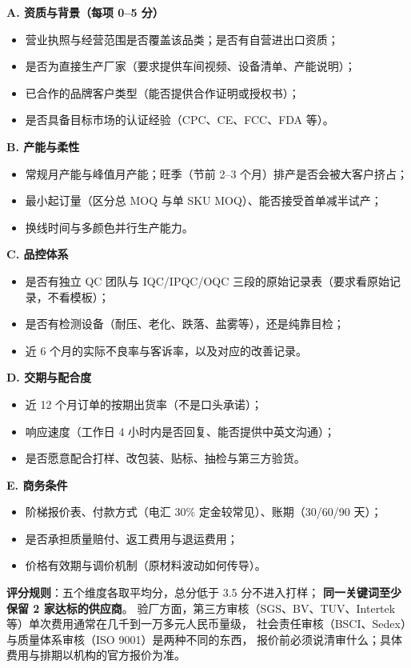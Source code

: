 \begin{toolbox}
\textbf{A. 资质与背景（每项 0--5 分）}
\begin{itemize}
  \item 营业执照与经营范围是否覆盖该品类；是否有自营进出口资质；
  \item 是否为直接生产厂家（要求提供车间视频、设备清单、产能说明）；
  \item 已合作的品牌客户类型（能否提供合作证明或授权书）；
  \item 是否具备目标市场的认证经验（CPC、CE、FCC、FDA 等）。
\end{itemize}
\textbf{B. 产能与柔性}
\begin{itemize}
  \item 常规月产能与峰值月产能；旺季（节前 2--3 个月）排产是否会被大客户挤占；
  \item 最小起订量（区分总 MOQ 与单 SKU MOQ）、能否接受首单减半试产；
  \item 换线时间与多颜色并行生产能力。
\end{itemize}
\textbf{C. 品控体系}
\begin{itemize}
  \item 是否有独立 QC 团队与 IQC/IPQC/OQC 三段的原始记录表（要求看原始记录，不看模板）；
  \item 是否有检测设备（耐压、老化、跌落、盐雾等），还是纯靠目检；
  \item 近 6 个月的实际不良率与客诉率，以及对应的改善记录。
\end{itemize}
\textbf{D. 交期与配合度}
\begin{itemize}
  \item 近 12 个月订单的按期出货率（不是口头承诺）；
  \item 响应速度（工作日 4 小时内是否回复、能否提供中英文沟通）；
  \item 是否愿意配合打样、改包装、贴标、抽检与第三方验货。
\end{itemize}
\textbf{E. 商务条件}
\begin{itemize}
  \item 阶梯报价表、付款方式（电汇 30\% 定金较常见）、账期（30/60/90 天）；
  \item 是否承担质量赔付、返工费用与退运费用；
  \item 价格有效期与调价机制（原材料波动如何传导）。
\end{itemize}
\textbf{评分规则}：五个维度各取平均分，总分低于 3.5 分不进入打样；
\textbf{同一关键词至少保留 2 家达标的供应商}。
验厂方面，第三方审核（SGS、BV、TUV、Intertek 等）单次费用通常在几千到一万多元人民币量级，
社会责任审核（BSCI、Sedex）与质量体系审核（ISO 9001）是两种不同的东西，
报价前必须说清审什么；具体费用与排期以机构的官方报价为准。
\end{toolbox}

